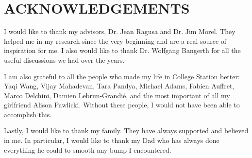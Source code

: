 \chapter*{ACKNOWLEDGEMENTS}
\indent I would like to thank my advisors, Dr. Jean Ragusa and Dr. Jim Morel. 
They helped me in my research since the very beginning and are a real
source of inspiration for me. I also would like to thank Dr. Wolfgang Bangerth 
for all the useful discussions we had over the years.

\indent I am also grateful to all the people who made my life in College
Station better: Yaqi Wang, Vijay Mahadevan, Tara Pandya, Michael Adams, Fabien
Auffret, Marco Delchini, Damien Lebrun-Grandi\'e, and the most important of all
my girlfriend Alison Pawlicki. Without these people, I would not have been
able to accomplish this. 

\indent Lastly, I would like to thank my family. They have always supported and
believed in me. In particular, I would like to thank my Dad who has always
done everything he could to smooth any bump I encountered.
\pagebreak{}
